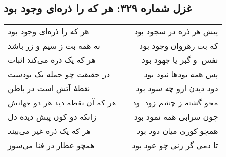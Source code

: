 \begin{center}
\section*{غزل شماره ۳۲۹: هر که را ذره‌ای وجود بود}
\label{sec:329}
\begin{longtable}{l p{0.5cm} r}
هر که را ذره‌ای وجود بود
&&
پیش هر ذره در سجود بود
\\
نه همه بت ز سیم و زر باشد
&&
که بت رهروان وجود بود
\\
هر که یک ذره می‌کند اثبات
&&
نفس او گبر یا جهود بود
\\
در حقیقت چو جمله یک بودست
&&
پس همه بودها نبود بود
\\
نقطهٔ آتش است در باطن
&&
دود دیدن ازو چه سود بود
\\
هر که آن نقطه دید هر دو جهانش
&&
محو گشته ز چشم زود بود
\\
زانکه دو کون پیش دیدهٔ دل
&&
چون سرابی همه نمود بود
\\
هر که یک ذره غیر می‌بیند
&&
همچو کوری میان دود بود
\\
همچو عطار در فنا می‌سوز
&&
تا دمی گر زنی چو عود بود
\\
\end{longtable}
\end{center}
